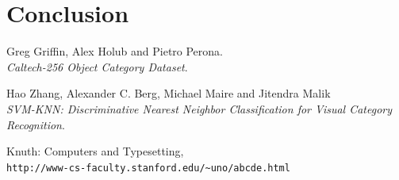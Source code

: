 \documentclass{article} %
\begin{document}
\section{Conclusion}




\begin{thebibliography}{9}

Greg Griffin, Alex Holub and Pietro Perona. \\
\textit{Caltech-256 Object Category Dataset}. 
 
Hao Zhang, Alexander C. Berg, Michael Maire and Jitendra Malik \\
\textit{SVM-KNN: Discriminative Nearest Neighbor Classification for Visual Category
Recognition}.

 
Knuth: Computers and Typesetting,
\\\texttt{http://www-cs-faculty.stanford.edu/\~{}uno/abcde.html}
\end{thebibliography}
\end{document}
